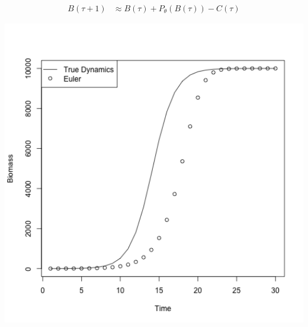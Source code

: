 \documentclass[ xcolor = pdftex, dvipsnames, table ]{beamer}
\begin{document}
\begin{frame}
{\begin{minipage}[h!]{0.64\textwidth}
\begin{align*}
B(\tau+1) &\approx B(\tau) + P_\theta(B(\tau)) - C(\tau)
\end{align*}
\end{minipage}
\begin{minipage}[h!]{0.24\textwidth}
\includegraphics[width=1.9\textwidth]{../plots/eulerTry.png}
\end{minipage}
}
\end{frame}
\end{document}
